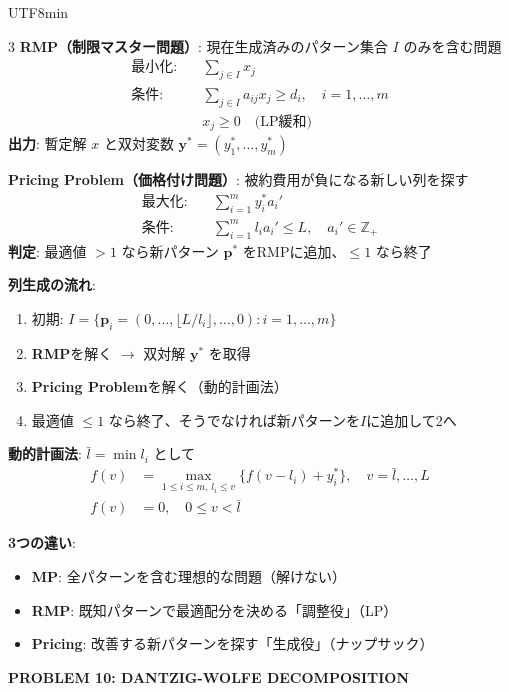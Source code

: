 \documentclass[8pt,a4paper]{article}
\newcommand{\mysection}[1]{\vspace{2pt}\textbf{#1}\vspace{1pt}}
\begin{document}
\begin{CJK}{UTF8}{min}
\begin{multicols}{3}
\textbf{RMP（制限マスター問題）}: 現在生成済みのパターン集合 $I$ のみを含む問題
\begin{align*}
\text{最小化:} \quad & \sum_{j \in I} x_j \\
\text{条件:} \quad & \sum_{j \in I} a_{ij} x_j \geq d_i, \quad i = 1, \ldots, m \\
& x_j \geq 0 \quad \text{(LP緩和)}
\end{align*}
\textbf{出力}: 暫定解 $x$ と双対変数 $\mathbf{y}^* = (y_1^*, \ldots, y_m^*)$

\textbf{Pricing Problem（価格付け問題）}: 被約費用が負になる新しい列を探す
\begin{align*}
\text{最大化:} \quad & \sum_{i=1}^m y_i^* a_i' \\
\text{条件:} \quad & \sum_{i=1}^m l_i a_i' \leq L, \quad a_i' \in \mathbb{Z}_+
\end{align*}
\textbf{判定}: 最適値 $> 1$ なら新パターン $\mathbf{p}^*$ をRMPに追加、$\leq 1$ なら終了

\textbf{列生成の流れ}:
\begin{enumerate}
    \item 初期: $I = \{\mathbf{p}_i = (0,\ldots,\lfloor L/l_i \rfloor,\ldots,0) : i=1,\ldots,m\}$
    \item \textbf{RMP}を解く $\to$ 双対解 $\mathbf{y}^*$ を取得
    \item \textbf{Pricing Problem}を解く（動的計画法）
    \item 最適値 $\leq 1$ なら終了、そうでなければ新パターンを$I$に追加して2へ
\end{enumerate}

\textbf{動的計画法}: $\bar{l} = \min l_i$ として
\begin{align*}
f(v) &= \max_{1 \leq i \leq m, \, l_i \leq v} \{ f(v-l_i) + y_i^* \}, \quad v = \bar{l},\ldots,L \\
f(v) &= 0, \quad 0 \leq v < \bar{l}
\end{align*}

\textbf{3つの違い}:
\begin{itemize}
    \item \textbf{MP}: 全パターンを含む理想的な問題（解けない）
    \item \textbf{RMP}: 既知パターンで最適配分を決める「調整役」（LP）
    \item \textbf{Pricing}: 改善する新パターンを探す「生成役」（ナップサック）
\end{itemize}

\mysection{PROBLEM 10: DANTZIG-WOLFE DECOMPOSITION}


\end{multicols}
\end{CJK}
\end{document}
